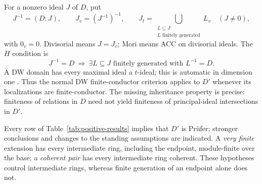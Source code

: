 \documentclass[11pt,reqno]{amsart}
\numberwithin{equation}{section}
\theoremstyle{plain}
\begin{document}
For a nonzero ideal $J$ of $D$, put
\[
 J^{-1}=(D:J),\qquad J_v=(J^{-1})^{-1},\qquad
 J_t=\bigcup_{\substack{L\subseteq J\\L\text{ finitely generated}}}L_v
 \quad(J\ne0),
\]
with $0_v=0$. Divisorial means $J=J_v$; Mori means ACC on divisorial
ideals. The $H$ condition \cite[\S3]{GlazVasconcelos1977} is
\[
 J^{-1}=D\ \Longrightarrow\
 \exists L\subseteq J\text{ finitely generated with }L^{-1}=D.
\]
A DW domain has every maximal ideal a $t$-ideal; this is automatic in
dimension one \cite[Prop.~2.9]{PicozzaTartarone2008}. Thus the normal
DW finite-conductor criterion applies to $D'$ whenever its localizations
are finite-conductor. The missing inheritance property is precise:
finiteness of relations in $D$ need not yield finiteness of
principal-ideal intersections in $D'$.

Every row of Table~\ref{tab:positive-results} implies that $D'$ is
Pr\"ufer; stronger conclusions and changes to the standing assumptions
are indicated. A \emph{very finite} extension has every intermediate
ring, including the endpoint, module-finite over the base; a
\emph{coherent pair} has every intermediate ring coherent. These
hypotheses control intermediate rings, whereas finite generation of
an endpoint alone does not.
\end{document}
